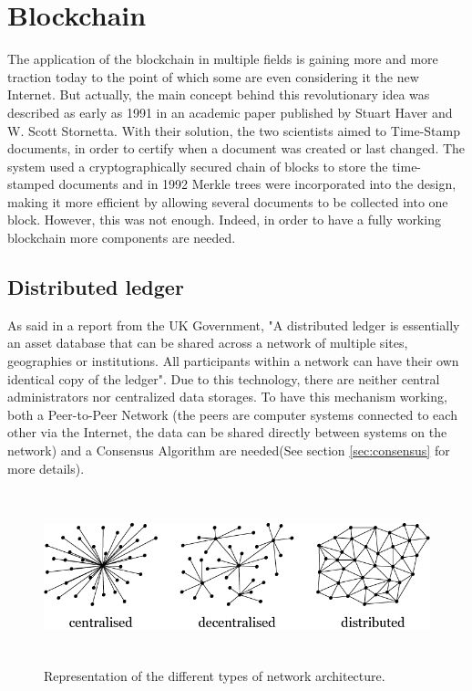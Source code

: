 \chapter{Blockchain}
\label{cha:blockchain}

The application of the blockchain in multiple fields is gaining more and more 
traction today to the point of which some are even considering it the new Internet\cite{newinternet}.
But actually, the main concept behind this revolutionary idea was described as 
early as 1991 in an academic paper\cite{haber}
published by Stuart Haver and W. Scott Stornetta. With their solution, the two 
scientists aimed to Time-Stamp documents, in order to certify when a document
was created or last changed. The system used a cryptographically secured 
chain of blocks to store the time-stamped documents and in 1992 Merkle 
trees\cite{merkletree} were incorporated into the design, making it more efficient by 
allowing several documents to be collected into one block.\cite{binancevision}
However, this was not enough. Indeed, in order to have a fully working blockchain 
more components are needed.




\section{Distributed ledger}
\label{sec:ledger}

As said in a report from the UK Government, "A distributed ledger is 
essentially an asset database that can be shared across a network of 
multiple sites, geographies or institutions. All participants within a 
network can have their own identical copy of the ledger"\cite{ukgov}.
Due to this technology, there are neither central administrators nor 
centralized data storages. To have this mechanism working, both
a Peer-to-Peer Network (the peers are computer systems connected
to each other via the Internet, the data can be shared directly between 
systems on the network) and a Consensus Algorithm are needed(See section \ref{sec:consensus} for more details). 

\begin{figure}[h]
    \centering
    \includegraphics[height=5cm, width=\textwidth]{distributed.png}
    \caption{Representation of the different types of network architecture.\cite{fauna}}
    \label{fig:dis}
\end{figure}

